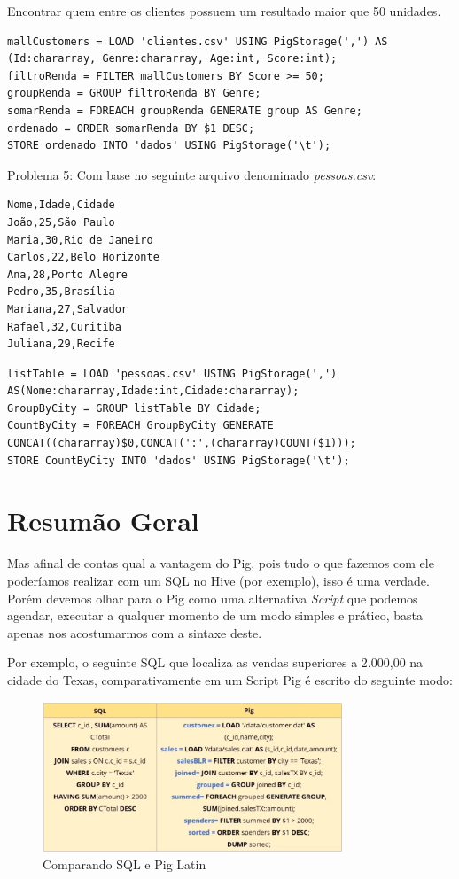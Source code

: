 \documentclass[a4paper,11pt]{article}
\begin{document}
Encontrar quem entre os clientes possuem um resultado maior que 50 unidades.
\begin{lstlisting}[]
mallCustomers = LOAD 'clientes.csv' USING PigStorage(',') AS (Id:chararray, Genre:chararray, Age:int, Score:int);
filtroRenda = FILTER mallCustomers BY Score >= 50;
groupRenda = GROUP filtroRenda BY Genre;
somarRenda = FOREACH groupRenda GENERATE group AS Genre;
ordenado = ORDER somarRenda BY $1 DESC;
STORE ordenado INTO 'dados' USING PigStorage('\t');
\end{lstlisting}

Problema 5:  Com base no seguinte arquivo denominado \textit{pessoas.csv}:
\begin{lstlisting}[]
Nome,Idade,Cidade
João,25,São Paulo
Maria,30,Rio de Janeiro
Carlos,22,Belo Horizonte
Ana,28,Porto Alegre
Pedro,35,Brasília
Mariana,27,Salvador
Rafael,32,Curitiba
Juliana,29,Recife
\end{lstlisting}

\begin{lstlisting}[]
listTable = LOAD 'pessoas.csv' USING PigStorage(',') AS(Nome:chararray,Idade:int,Cidade:chararray);
GroupByCity = GROUP listTable BY Cidade;
CountByCity = FOREACH GroupByCity GENERATE CONCAT((chararray)$0,CONCAT(':',(chararray)COUNT($1)));
STORE CountByCity INTO 'dados' USING PigStorage('\t');
\end{lstlisting}

\section{Resumão Geral}
Mas afinal de contas qual a vantagem do Pig, pois tudo o que fazemos com ele poderíamos realizar com um SQL no Hive (por exemplo), isso é uma verdade. Porém devemos olhar para o Pig como uma alternativa \textit{Script} que podemos agendar, executar a qualquer momento de um modo simples e prático, basta apenas nos acostumarmos com a sintaxe deste. 

Por exemplo, o seguinte SQL que localiza as vendas superiores a 2.000,00 na cidade do Texas, comparativamente em um Script Pig é escrito do seguinte modo:
\begin{figure}[H]
	\centering
	\includegraphics[width=0.8\textwidth]{imagem/vendas}
	\caption{Comparando SQL e Pig Latin}
\end{figure}
\end{document}
